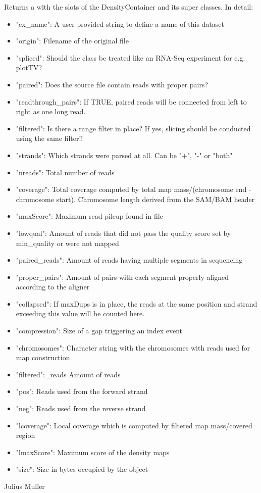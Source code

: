 \documentclass[letterpaper]{book}
\begin{document}
\begin{Value}
Returns a  with the slots of the DensityContainer and its super classes.
In detail:
\begin{itemize}


\item{} "ex\_name": A user provided string to define a name of this dataset
\item{} "origin": Filename of the original file
\item{} "spliced": Should the class be treated like an RNA-Seq experiment for e.g. plotTV?
\item{} "paired": Does the source file contain reads with proper pairs? 
\item{} "readthrough\_pairs": If TRUE, paired reads will be connected from left to right as one long read.
\item{} "filtered": Is there a range filter in place? If yes, slicing should be  conducted using the same filter!!
\item{} "strands": Which strands were parsed at all. Can be "+", "-" or "both"
\item{} "nreads": Total number of reads
\item{} "coverage": Total coverage computed by total map mass/(chromosome end - chromosome start). Chromosome length derived from the SAM/BAM header
\item{} "maxScore": Maximum read pileup found in file
\item{} "lowqual": Amount of reads that did not pass the quality score set by min\_quality or were not mapped
\item{} "paired\_reads": Amount of reads having multiple segments in sequencing
\item{} "proper\_pairs": Amount of pairs with each segment properly aligned according to the aligner
\item{} "collapsed": If maxDups is in place, the reads at the same position and strand exceeding this value will be counted here.
\item{} "compression": Size of a gap triggering an index event
\item{} "chromosomes": Character string with the chromosomes with reads used for map construction
\item{} "filtered":\_reads Amount of reads
\item{} "pos": Reads used from the forward strand
\item{} "neg": Reads used from the reverse strand
\item{} "lcoverage": Local coverage which is computed by filtered map mass/covered region
\item{} "lmaxScore": Maximum score of the density maps
\item{} "size": Size in bytes occupied by the object

\end{itemize}

\end{Value}
%
\begin{Author}
Julius Muller 
\end{Author}
\printindex{}
\end{document}

